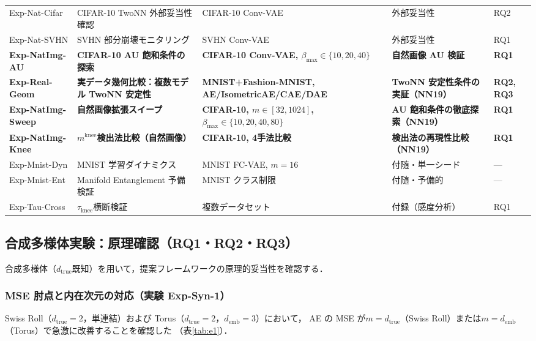 \documentclass[11pt,a4paper]{jsarticle}
\newcommand{\dtrue}{d_{\mathrm{true}}}
\newcommand{\mknee}{m^{\mathrm{knee}}}
\newcommand{\demb}{d_{\mathrm{emb}}}
\begin{document}
\begin{table}[H]
\begin{tabular}{lllll}
Exp-Nat-Cifar & CIFAR-10 TwoNN 外部妥当性確認 & CIFAR-10 Conv-VAE & 外部妥当性 & RQ2 \\
Exp-Nat-SVHN & SVHN 部分崩壊モニタリング & SVHN Conv-VAE & 外部妥当性 & RQ1 \\
\textbf{Exp-NatImg-AU} & \textbf{CIFAR-10 AU 飽和条件の探索} & \textbf{CIFAR-10 Conv-VAE, $\beta_{\max}\in\{10,20,40\}$} & \textbf{自然画像 AU 検証} & \textbf{RQ1} \\
\textbf{Exp-Real-Geom} & \textbf{実データ幾何比較：複数モデル TwoNN 安定性} & \textbf{MNIST+Fashion-MNIST, AE/IsometricAE/CAE/DAE} & \textbf{TwoNN 安定性条件の実証（NN19）} & \textbf{RQ2, RQ3} \\
\textbf{Exp-NatImg-Sweep} & \textbf{自然画像拡張スイープ} & \textbf{CIFAR-10, $m\in[32,1024]$, $\beta_{\max}\in\{10,20,40,80\}$} & \textbf{AU 飽和条件の徹底探索（NN19）} & \textbf{RQ1} \\
\textbf{Exp-NatImg-Knee} & \textbf{$\mknee$検出法比較（自然画像）} & \textbf{CIFAR-10, 4手法比較} & \textbf{検出法の再現性比較（NN19）} & \textbf{RQ1} \\
Exp-Mnist-Dyn & MNIST 学習ダイナミクス & MNIST FC-VAE, $m=16$ & 付随・単一シード & --- \\
Exp-Mnist-Ent & Manifold Entanglement 予備検証 & MNIST クラス制限 & 付随・予備的 & --- \\
Exp-Tau-Cross & $\tau_\mathrm{knee}$横断検証 & 複数データセット & 付録（感度分析） & RQ1 \\
\bottomrule
\end{tabular}
\end{table}

\subsection{合成多様体実験：原理確認（RQ1・RQ2・RQ3）}\label{sec:exp_synthetic}

合成多様体（$\dtrue$既知）を用いて，提案フレームワークの原理的妥当性を確認する．

\subsubsection{MSE 肘点と内在次元の対応（実験 Exp-Syn-1）}

Swiss Roll（$\dtrue = 2$，単連結）および Torus（$\dtrue = 2$，$\demb = 3$）において，
AE の MSE が$m = \dtrue$（Swiss Roll）または$m = \demb$（Torus）で急激に改善することを確認した
（表\ref{tab:e1}）．
\end{document}

